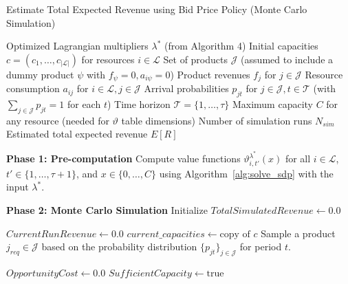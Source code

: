 \documentclass[11pt]{article}
\begin{document}
\begin{algorithm}[H]
\caption{Estimate Total Expected Revenue using Bid Price Policy (Monte Carlo Simulation)}
\label{alg:monte_carlo_revenue}
\begin{algorithmic}[1]
\Input
    \State Optimized Lagrangian multipliers $\lambda^*$ (from Algorithm 4)
    \State Initial capacities $c = (c_1, \ldots, c_{|\mathcal{L}|})$ for resources $i \in \mathcal{L}$
    \State Set of products $\mathcal{J}$ (assumed to include a dummy product $\psi$ with $f_\psi=0, a_{i\psi}=0$)
    \State Product revenues $f_j$ for $j \in \mathcal{J}$
    \State Resource consumption $a_{ij}$ for $i \in \mathcal{L}, j \in \mathcal{J}$
    \State Arrival probabilities $p_{jt}$ for $j \in \mathcal{J}, t \in \mathcal{T}$ (with $\sum_{j \in \mathcal{J}} p_{jt} = 1$ for each $t$)
    \State Time horizon $\mathcal{T} = \{1, \ldots, \tau\}$
    \State Maximum capacity $C$ for any resource (needed for $\vartheta$ table dimensions)
    \State Number of simulation runs $N_{sim}$
\Output
    \State Estimated total expected revenue $E[R]$

\Statex
\State \textbf{Phase 1: Pre-computation}
\State Compute value functions $\vartheta^{\lambda^*}_{i,t'}(x)$ for all $i \in \mathcal{L}$, $t' \in \{1, \ldots, \tau+1\}$, and $x \in \{0, \ldots, C\}$ using Algorithm~\ref{alg:solve_sdp} with the input $\lambda^*$.
\Statex {}

\Statex
\State \textbf{Phase 2: Monte Carlo Simulation}
\State Initialize $TotalSimulatedRevenue \gets 0.0$

 
    \State $CurrentRunRevenue \gets 0.0$
    \State $current\_capacities \gets \text{copy of } c$ 
     
        \State Sample a product $j_{req} \in \mathcal{J}$ based on the probability distribution $\{p_{jt}\}_{j \in \mathcal{J}}$ for period $t$.
        
         
            \State $OpportunityCost \gets 0.0$
            \State $SufficientCapacity \gets \text{true}$
            

\end{algorithmic}
\end{algorithm}
\end{document}
